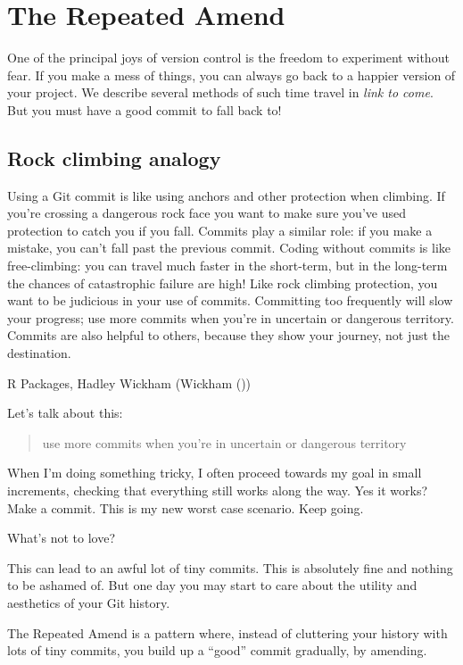 \documentclass[
]{book}
\begin{document}
\chapter{The Repeated Amend}\label{repeated-amend}

One of the principal joys of version control is the freedom to experiment without fear.
If you make a mess of things, you can always go back to a happier version of your project.
We describe several methods of such time travel in \emph{link to come}.
But you must have a good commit to fall back to!

\section{Rock climbing analogy}\label{rock-climbing-analogy}

Using a Git commit is like using anchors and other protection when climbing. If you're crossing a dangerous rock face you want to make sure you've used protection to catch you if you fall. Commits play a similar role: if you make a mistake, you can't fall past the previous commit. Coding without commits is like free-climbing: you can travel much faster in the short-term, but in the long-term the chances of catastrophic failure are high! Like rock climbing protection, you want to be judicious in your use of commits. Committing too frequently will slow your progress; use more commits when you're in uncertain or dangerous territory. Commits are also helpful to others, because they show your journey, not just the destination.

R Packages, Hadley Wickham (Wickham ())

Let's talk about this:

\begin{quote}
use more commits when you're in uncertain or dangerous territory
\end{quote}

When I'm doing something tricky, I often proceed towards my goal in small increments, checking that everything still works along the way.
Yes it works?
Make a commit.
This is my new worst case scenario.
Keep going.

What's not to love?

This can lead to an awful lot of tiny commits.
This is absolutely fine and nothing to be ashamed of.
But one day you may start to care about the utility and aesthetics of your Git history.

The Repeated Amend is a pattern where, instead of cluttering your history with lots of tiny commits, you build up a ``good'' commit gradually, by amending.
\end{document}
